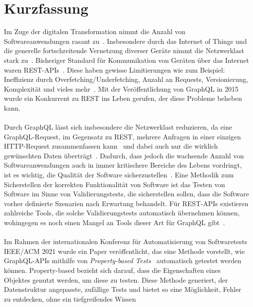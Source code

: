 \chapter{Kurzfassung}

Im Zuge der digitalen Transformation nimmt die Anzahl von Softwareanwendungen rasant zu~\cite{digitale-transformation}.
Insbesondere durch das Internet of Things und die generelle fortschreitende Vernetzung diverser Geräte nimmt die Netzwerklast stark zu~\cite{iot-traffic}.
Bisheriger Standard für Kommunikation von Geräten über das Internet waren REST-APIs~\cite[vgl. Introduction]{hygraph}.
Diese haben gewisse Limitierungen wie zum Beispiel: Ineffizienz durch Overfetching/Underfetching, Anzahl an Requests, Versionierung, Komplexität und vieles mehr~\cite{hygraph}.
Mit der Veröffentlichung von GraphQL in 2015 wurde ein Konkurrent zu REST ins Leben gerufen, der diese Probleme beheben kann.
\\
\\
Durch GraphQL lässt sich insbesondere die Netzwerklast reduzieren, da eine GraphQL-Request, im Gegensatz zu REST, mehrere Anfragen in einer einzigen HTTP-Request zusammenfassen kann~\cite{awsrestgraphql}
und dabei auch nur die wirklich gewünschten Daten überträgt~\cite[vgl. Advantages of GraphQL APIs]{hygraph}.
Dadurch, dass jedoch die wachsende Anzahl von Softwareanwendungen auch in immer kritischere Bereiche des Lebens vordringt, ist es wichtig, die Qualität der Software sicherzustellen~\cite[S. 16]{software-testing}.
Eine Methodik zum Sicherstellen der korrekten Funktionalität von Software ist das Testen von Software im Sinne von Validierungstests, die sicherstellen sollen, dass die Software vorher definierte Szenarien nach Erwartung behandelt.
Für REST-APIs existieren zahlreiche Tools, die solche Validierungstests automatisch übernehmen können, wohingegen es noch einen Mangel an Tools dieser Art für GraphQL gibt~\cite[vgl. Introduction]{property-based-testing}.
\\
\\
Im Rahmen der internationalen Konferenz für Automatisierung von Softwaretests IEEE/ACM 2021 wurde ein Paper veröffentlicht, das eine Methode vorstellt, wie GraphQL-APIs mithilfe von
\textit{Property-based Tests}~\cite{property-based-testing} automatisch getestet werden können.
Property-based bezieht sich darauf, dass die Eigenschaften eines Objektes genutzt werden, um diese zu testen.
Diese Methode generiert, der Datenstruktur angepasste, zufällige Tests und bietet so eine Möglichkeit, Fehler zu entdecken, ohne ein tiefgreifendes Wissen
